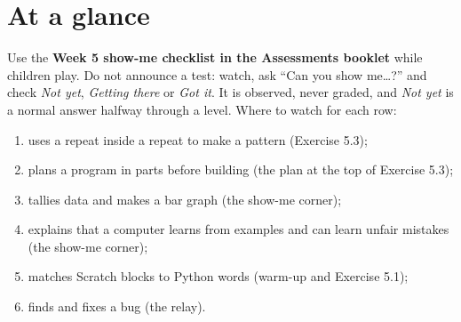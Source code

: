 \section{At a glance}
\begin{timeplan}
\end{timeplan}

\begin{teachernote}
Use the \textbf{Week 5 show-me checklist in the Assessments booklet} while children play. Do not announce a test: watch, ask \enquote{Can you show me\ldots?} and check \emph{Not yet}, \emph{Getting there} or \emph{Got it}. It is observed, never graded, and \emph{Not yet} is a normal answer halfway through a level. Where to watch for each row:
\begin{enumerate}[leftmargin=1.4em,itemsep=0pt]
  \item uses a repeat inside a repeat to make a pattern (Exercise 5.3);
  \item plans a program in parts before building (the plan at the top of Exercise 5.3);
  \item tallies data and makes a bar graph (the show-me corner);
  \item explains that a computer learns from examples and can learn unfair mistakes (the show-me corner);
  \item matches Scratch blocks to Python words (warm-up and Exercise 5.1);
  \item finds and fixes a bug (the relay).
\end{enumerate}
\end{teachernote}


